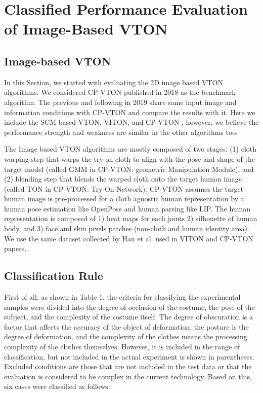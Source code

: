 
\section{Classified Performance Evaluation of Image-Based VTON}

\subsection{Image-based VTON}

In this Section, we started with evaluating the 2D image based VTON algorithms. We considered CP-VTON \cite{Wang2018TowardCI} published in 2018 as the benchmark algorithm. The previous and following in 2019 share same input image and information conditions with CP-VTON and compare the results with it. Here we include the SCM based-VTON, VITON\cite{Han2017VITONAI}, and  CP-VTON \cite{Wang2018TowardCI}, however, we believe the performance strength and weakness are similar in the other algorithms too.


The Image based VTON algorithms are mostly composed of two stages: (1) cloth warping step that warps the try-on cloth to align with the pose and shape of the target model (called GMM in CP-VTON: geometric Manipulation Module)\cite{Wang2018TowardCI}, and (2) blending step that blends the warped cloth onto the target human image (called TON in CP-VTON: Try-On Network)\cite{Wang2018TowardCI}. CP-VTON assumes the target human image is pre-processed for a cloth agnostic human representation by a human pose estimation like OpenPose\cite{Cao2018OpenPoseRM} and human parsing like LIP\cite{Liang2018LookIP}. The human representation is composed of 1) heat maps for each joints 2) silhouette of human body, and 3) face and skin pixels patches (non-cloth and human identity area). We use the same dataset collected by Han et al. used in VITON\cite{Han2017VITONAI} and CP-VTON\cite{Wang2018TowardCI} papers.
 


 
\subsection{Classification Rule}

First of all, as shown in Table 1, the criteria for classifying the experimental samples were divided into the degree of occlusion of the costume, the pose of the subject, and the complexity of the costume itself. The degree of obscuration is a factor that affects the accuracy of the object of deformation, the posture is the degree of deformation, and the complexity of the clothes means the processing complexity of the clothes themselves. However, it is included in the range of classification, but not included in the actual experiment is shown in parentheses. Excluded conditions are those that are not included in the test data or that the evaluation is considered to be complex in the current technology. Based on this, six cases were classified as follows.


